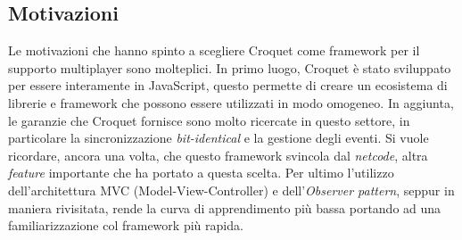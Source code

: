 \subsection{Motivazioni}\label{subsec:Croquet_motivazioni}
Le motivazioni che hanno spinto a scegliere Croquet come framework per il supporto multiplayer sono molteplici. In primo luogo, Croquet è stato sviluppato per essere interamente
in JavaScript, questo permette di creare un ecosistema di librerie e framework che possono essere utilizzati in modo omogeneo. In aggiunta, le garanzie che Croquet fornisce sono
molto ricercate in questo settore, in particolare la sincronizzazione \textit{bit-identical} e la gestione degli eventi. Si vuole ricordare, ancora una volta, che
questo framework svincola dal \textit{netcode}, altra \textit{feature} importante che ha portato a questa scelta. Per ultimo l'utilizzo dell'architettura MVC (Model-View-Controller) 
e dell'\textit{Observer pattern}, seppur in maniera rivisitata, rende la curva di apprendimento più bassa portando ad una familiarizzazione col framework più rapida.\\